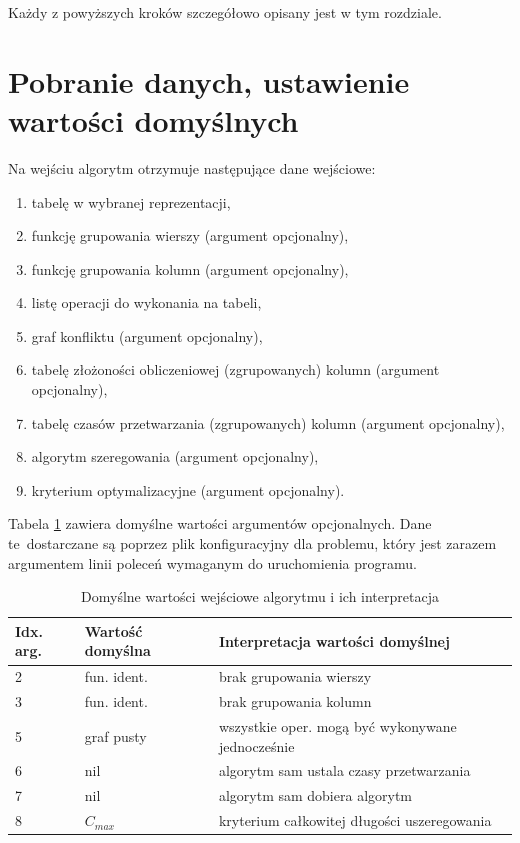 \documentclass[brudnopis]{xmgr}
\begin{document}
Każdy z powyższych kroków szczegółowo opisany jest w tym rozdziale.
\newpage


\section{Pobranie danych, ustawienie wartości domyślnych}

Na wejściu algorytm otrzymuje następujące dane wejściowe:
\begin{enumerate}
    \item tabelę w wybranej reprezentacji,
    \item funkcję grupowania wierszy (argument opcjonalny),
    \item funkcję grupowania kolumn (argument opcjonalny),
    \item listę operacji do wykonania na tabeli,
    \item graf konfliktu (argument opcjonalny),
    \item tabelę złożoności obliczeniowej (zgrupowanych) kolumn (argument opcjonalny),
    \item tabelę czasów przetwarzania (zgrupowanych) kolumn (argument opcjonalny),
    \item algorytm szeregowania (argument opcjonalny),
    \item kryterium optymalizacyjne (argument opcjonalny).
\end{enumerate}

Tabela \ref{tab:args-default} zawiera domyślne wartości argumentów opcjonalnych. Dane te~dostarczane są poprzez plik konfiguracyjny dla problemu, który jest zarazem argumentem linii poleceń wymaganym do uruchomienia programu.
\medskip

\begin{table}[!tbh]
\begin{tabular}{|l|l|l|} \hline
Idx. arg. & Wartość domyślna & Interpretacja wartości domyślnej \\ \hline
2 & fun. ident. & brak grupowania wierszy \\ \hline
3 & fun. ident. & brak grupowania kolumn \\ \hline
5 & graf pusty  & wszystkie oper. mogą być wykonywane jednocześnie \\ \hline
6 & nil         & algorytm sam ustala czasy przetwarzania \\ \hline
7 & nil         & algorytm sam dobiera algorytm \\ \hline
8 & $C_{max}$   & kryterium całkowitej długości uszeregowania \\ \hline
\end{tabular}
\caption{Domyślne wartości wejściowe algorytmu i ich interpretacja\label{tab:args-default}}
\end{table}
\medskip
\end{document}
